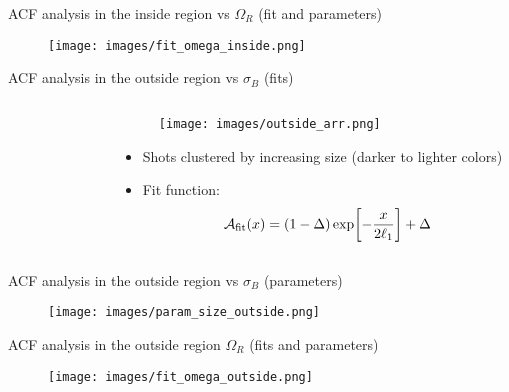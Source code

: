 \documentclass[aspectratio=169]{beamer}
\begin{document}
\begin{frame}{ACF analysis in the inside region vs $\Omega_R$ (fit and parameters)}
  \begin{figure}
      \centering
      \texttt{[image: images/fit\_omega\_inside.png]}
  \end{figure}
\end{frame}

\begin{frame}{ACF analysis in the outside region vs $\sigma_B$ (fits)}
  \begin{columns}
    \begin{column}{0.55\textwidth}
      \begin{figure}
        \centering
      \end{figure}
    \end{column}
    \begin{column}{0.45\textwidth}
      \begin{figure}
        \centering
        \texttt{[image: images/outside\_arr.png]}
      \end{figure}
      \begin{itemize}
        \item Shots clustered by increasing size (darker to lighter colors)
        \item Fit function:
        \[
          \mathcal{A}_{\rm fit}(x) = (1-\Delta)\exp[-\frac{x}{2\ell_1}] + \Delta
        \]
      \end{itemize}
    \end{column}
  \end{columns}
\end{frame}

\begin{frame}{ACF analysis in the outside region vs $\sigma_B$ (parameters)}
  \begin{figure}
    \centering
    \texttt{[image: images/param\_size\_outside.png]}
  \end{figure}
\end{frame}

\begin{frame}{ACF analysis in the outside region $\Omega_R$ (fits and parameters)}
  \begin{figure}
      \centering
      \texttt{[image: images/fit\_omega\_outside.png]}
  \end{figure}
\end{frame}
\end{document}
